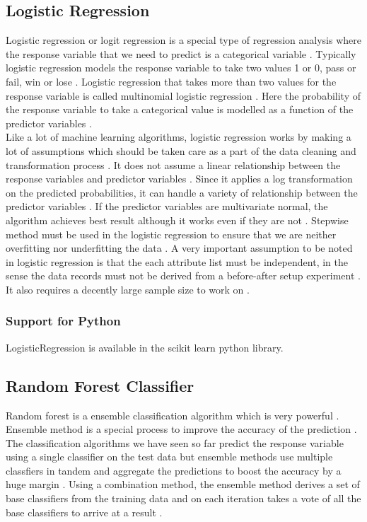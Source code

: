 \documentclass[sigconf]{acmart}
\begin{document}
\subsection{Logistic Regression}
Logistic regression or logit regression is a special type of regression analysis where the response variable that we need to predict is a categorical variable \cite{book-tan}. Typically logistic regression models the response variable to take two values 1 or 0, pass or fail, win or lose \cite{book-tan}. Logistic regression that takes more than two values for the response variable is called multinomial logistic regression \cite{book-tan}. Here the probability of the response variable to take a categorical value is modelled as a function of the predictor variables \cite{book-tan}. \\

Like a lot of machine learning algorithms, logistic regression works by making a lot of assumptions which should be taken care as a part of the data cleaning and transformation process \cite{book-shai}. It does not assume a linear relationship between the response variables and predictor variables \cite{book-shai}. Since it applies a log transformation on the predicted probabilities, it can handle a variety of relationship between the predictor variables \cite{book-shai}. If the predictor variables are multivariate normal, the algorithm achieves best result although it works even if they are not \cite{book-shai}. Stepwise method must be used in the logistic regression to ensure that we are neither overfitting nor underfitting the data \cite{book-shai}. A very important assumption to be noted in logistic regression is that the each attribute list must be independent, in the sense the data records must not be derived from a before-after setup experiment \cite{book-shai}. It also requires a decently large sample size to work on \cite{book-shai}. 

\subsubsection{Support for Python} LogisticRegression is available in the scikit learn python library.

\subsection{Random Forest Classifier}
Random forest is a ensemble classification algorithm which is very powerful \cite{book-tan}. Ensemble method is a special process to improve the accuracy of the prediction \cite{book-tan}. The classification algorithms we have seen so far predict the response variable using a single classifier on the test data but ensemble methods use multiple classfiers in tandem and aggregate the predictions to boost the accuracy by a huge margin \cite{book-tan}. Using a combination method, the ensemble method derives a set of base classifiers from the training data and on each iteration takes a vote of all the base classifiers to arrive at a result \cite{book-tan}. \\
\end{document}

